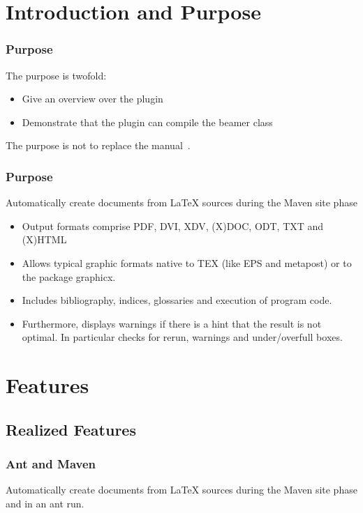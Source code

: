 \section{Introduction and Purpose}

\begin{frame}
  \frametitle{Purpose}
  The purpose is twofold:
  \begin{itemize}
    \item Give an overview over the plugin
    \item Demonstrate that the plugin can compile the beamer class
  \end{itemize}
  The purpose is not to replace the manual~\cite{LatexPlugin}.
\end{frame}

\begin{frame}
  \frametitle{Purpose}
  Automatically create documents from LaTeX sources during the Maven site phase
  \begin{itemize}
    \item
          Output formats comprise PDF, DVI, XDV, (X)DOC, ODT, TXT and (X)HTML%
    \item
          Allows typical graphic formats native to TEX (like EPS and metapost)
          or to the package graphicx.
    \item
          Includes bibliography, indices, glossaries and execution of program code.
    \item
          Furthermore, displays warnings if there is a hint that the result is not optimal.
          In particular checks for rerun, warnings and under/overfull boxes.
  \end{itemize}
\end{frame}

\section{Features}

\subsection{Realized Features}

\begin{frame}
  \frametitle{Ant and Maven}
  Automatically create documents from LaTeX sources during the Maven site phase 
  and in an ant run. 

\end{frame}

